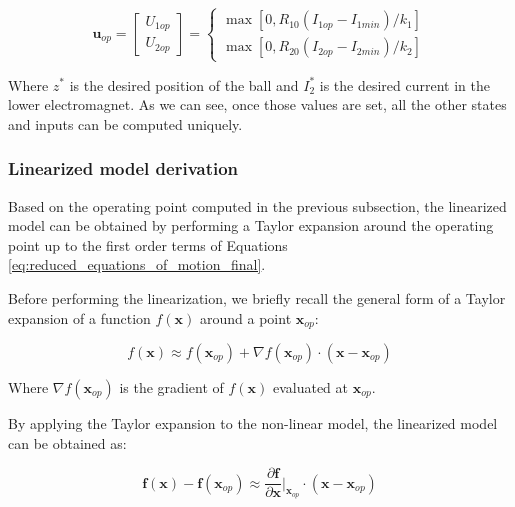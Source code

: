 \begin{equation}
    \mathbf{u}_{op} =
    \begin{bmatrix}
        U_{1op} \\
        U_{2op}
    \end{bmatrix}
    =
    \begin{cases}
        \max{\left[0, R_{10} \left( I_{1op} - I_{1min} \right) / k_1 \right]} \\
        \max{\left[0, R_{20} \left( I_{2op} - I_{2min} \right) / k_2 \right]}
    \end{cases}
    \label{eq:operating_point_inputs}
\end{equation}

Where $z^*$ is the desired position of the ball and $I_{2}^*$ is the desired current in the lower electromagnet.
As we can see, once those values are set, all the other states and inputs can be computed uniquely.



\subsubsection{Linearized model derivation}
\label{subsubsec:linearized_model_derivation}

Based on the operating point computed in the previous subsection, the linearized model can be obtained by performing a Taylor expansion around the operating point up to the first order terms of Equations \ref{eq:reduced_equations_of_motion_final}.

Before performing the linearization, we briefly recall the general form of a Taylor expansion of a function $f(\mathbf{x})$ around a point $\mathbf{x}_{op}$:

\begin{equation}
    f(\mathbf{x}) \approx f(\mathbf{x}_{op}) + \nabla f(\mathbf{x}_{op}) \cdot (\mathbf{x} - \mathbf{x}_{op})
\end{equation}

Where $\nabla f(\mathbf{x}_{op})$ is the gradient of $f(\mathbf{x})$ evaluated at $\mathbf{x}_{op}$.

By applying the Taylor expansion to the non-linear model, the linearized model can be obtained as:

\begin{equation}
    \mathbf{f}(\mathbf{x}) - \mathbf{f}(\mathbf{x}_{op})\approx \frac{\partial \mathbf{f}}{\partial \mathbf{x}} \Bigg|_{\mathbf{x}_{op}} \cdot (\mathbf{x} - \mathbf{x}_{op})
\end{equation}

